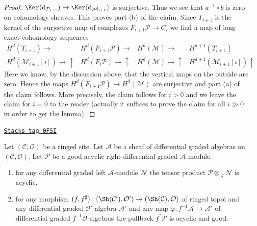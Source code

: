 \begin{proof}
$\Ker(\text{d}_{\mathcal{P}_{i + 1}}) \to
\Ker(\text{d}_{\mathcal{M}_{i + 1}})$ is surjective.
Thus we see that $a^{-1} \circ b$ is zero on cohomology sheaves.
This proves part (b) of the claim.
Since $T_{i + 1}$ is the kernel of the surjective map of complexes
$F_{i + 1}\mathcal{P} \to C_i$ we find a map of long exact
cohomology sequences
$$
\begin{array}{cccc}H^d(T_{i + 1}) \longrightarrow & H^d(F_{i + 1}\mathcal{P}) \longrightarrow & H^d(\mathcal{M}) \longrightarrow & H^{d + 1}(T_{i + 1}) \\ H^d(\mathcal{M}_{i + 1}[i]) \longrightarrow\uparrow & H^d(F_i\mathcal{P}) \longrightarrow\uparrow & H^d(\mathcal{M}) \longrightarrow\uparrow & H^{d + 1}(\mathcal{M}_{i + 1}[i]) \uparrow\end{array}
$$
Here we know, by the discussion above, that the vertical maps
on the outside are zero. Hence the maps
$H^d(F_{i + 1}\mathcal{P}) \to H^d(\mathcal{M})$
are surjective and part (a) of the claim follows.
More precisely, the claim follows for $i > 0$ and we leave the
claim for $i = 0$ to the reader (actually it suffices to prove
the claim for all $i \gg 0$ in order to get the lemma).
\end{proof}

\begin{lemma}
\label{sdga-lemma-acyclic-good}
\href{https://stacks.math.columbia.edu/tag/0FSI}{\texttt{Stacks tag 0FSI}}

Let $(\mathcal{C}, \mathcal{O})$ be a ringed site.
Let $\mathcal{A}$ be a sheaf of differential graded algebras
on $(\mathcal{C}, \mathcal{O})$. Let $\mathcal{P}$ be a good
acyclic right differential graded $\mathcal{A}$-module.
\begin{enumerate}
\item for any differential graded left $\mathcal{A}$-module
$\mathcal{N}$ the tensor product
$\mathcal{P} \otimes_\mathcal{A} \mathcal{N}$ is acyclic,
\item for any morphism $(f, f^\sharp) : (\Sh(\mathcal{C}'), \mathcal{O}')
\to (\Sh(\mathcal{C}), \mathcal{O})$
of ringed topoi and any differential graded $\mathcal{O}'$-algebra
$\mathcal{A}'$ and any map $\varphi : f^{-1}\mathcal{A} \to \mathcal{A}'$
of differential graded $f^{-1}\mathcal{O}$-algebras
the pullback $f^*\mathcal{P}$ is acyclic and good.
\end{enumerate}
\end{lemma}


